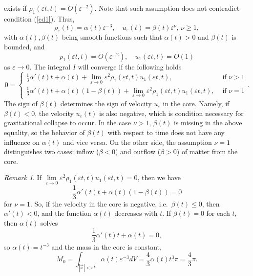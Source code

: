 \documentclass[reqno]{article}%
\theoremstyle{plain}
\theoremstyle{definition}
\theoremstyle{remark}
\newtheorem{remark}{Remark}[section]
\numberwithin{equation}{section}
\begin{document}
exists if $\rho_1(\varepsilon t,t)=O(\varepsilon^{-2})$. Note that such assumption does not contradict condition (\ref{cd1}). Thus, 
\begin{equation}\label{assum1}
\rho_\varepsilon(t)=\alpha(t)\varepsilon^{-3},\quad u_\varepsilon(t)=\beta(t)\varepsilon^\nu,\,\nu\geq 1,
\end{equation}
with $\alpha(t),\beta(t)$ being  smooth functions such that $\alpha(t)> 0$ and $\beta(t)$ is bounded,
and  
\begin{equation}\label{assum3}
\rho_1(\varepsilon t,t)=O(\varepsilon^{-2}),\quad u_1(\varepsilon t,t)=O(1)
\end{equation}
as $\varepsilon \to 0.$
The integral $I$ will  converge if the following holds
\[0= \begin{cases}
\frac{1}{3} \alpha'(t)t+\alpha(t)+\lim_{\varepsilon\to 0}\varepsilon^2 \rho_1(\varepsilon t,t)u_1(\varepsilon t,t), & \text{ if } \nu>1\\
\frac{1}{3} \alpha'(t)t+\alpha(t)(1-\beta(t))+\lim_{\varepsilon\to 0}\varepsilon^2 \rho_1(\varepsilon t,t)u_1(\varepsilon t,t), & \text{ if } \nu=1
\end{cases}.\]
The sign of $\beta(t)$ determines the sign of velocity $u_\varepsilon$ in the core. Namely, if $\beta(t)<0$, the velocity $u_\varepsilon(t)$ is also negative, which is condition necessary for gravitational collapse to occur. In the case $\nu>1$,  $\beta(t)$ is missing in the above equality, so the behavior of $\beta(t)$ with respect to time does not have any influence on $\alpha(t)$ and vice versa.   On the other side, the assumption $\nu=1$  distinguishes two cases: inflow ($\beta<0$) and outflow ($\beta>0$) of matter from the core.

\begin{remark}
If $\lim\limits_{\varepsilon\to 0}\varepsilon^2 \rho_1(\varepsilon t,t)u_1(\varepsilon t,t)=0$, then we have
\[\frac{1}{3} \alpha'(t)t+\alpha(t)(1-\beta(t))=0\]
for $\nu=1.$
So, if the velocity in  the core is negative, i.e.\ $\beta(t)\leq 0$, then $\alpha'(t)<0$, and the function $\alpha(t)$ decreases with $t$.  If $\beta(t)=0$ for each $t$, then $\alpha(t)$ solves
\[\frac{1}{3}\alpha'(t)t+\alpha(t)=0,\]
so $\alpha(t)=t^{-3}$
and the mass in the core is constant,
\[M_0=\int_{|\vec{x}|<\varepsilon t} \alpha(t)\varepsilon^{-3}dV=\frac{4}{3}\alpha(t)t^3\pi =\frac{4}{3}\pi.\]

\end{remark}
\end{document}

